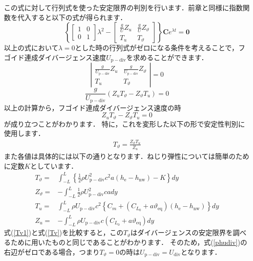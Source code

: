\documentclass{jarticle}
\begin{document}
この式に対して行列式を使った安定限界の判別を行います．前章と同様に指数関数を代入すると以下の式が得られます．
\begin{equation}
    \left\{
    \begin{bmatrix}
        1 & 0 \\
        0 & 1
    \end{bmatrix}
    \lambda^2
    -
    \begin{bmatrix}
        \frac{g}{U}Z_u & \frac{g}{U}Z_\vartheta \\
        T_u & T_\vartheta
    \end{bmatrix}
    \right\}
    \bm{C}e^{\lambda t}
    =
    \bm{0}
\end{equation}
以上の式において$\lambda=0$とした時の行列式がゼロになる条件を考えることで，フゴイド連成ダイバージェンス速度$U_\mathrm{p-div}$を求めることができます．
\begin{equation}
    \left|
    \begin{matrix}
        \frac{g}{U_\mathrm{p-div}}Z_u & \frac{g}{U_\mathrm{p-div}}Z_\vartheta \\
        T_u & T_\vartheta
    \end{matrix}
    \right|
    =0
\end{equation}
\begin{equation}
    \frac{g}{U_\mathrm{p-div}} (Z_u T_\vartheta - Z_\vartheta T_u ) = 0
\end{equation}
以上の計算から，フゴイド連成ダイバージェンス速度の時
\begin{equation}
    Z_u T_\vartheta - Z_\vartheta T_u  = 0
\end{equation}
が成り立つことがわかります．
特に，これを変形した以下の形で安定性判別に使用します．
\begin{align}\label{phudiv}
    T_\vartheta = \frac{Z_\vartheta T_u}{Z_u}
\end{align}
また各値は具体的には以下の通りとなります．ねじり弾性については簡単のために定数$K$としています．
\begin{align}
    T_\vartheta =& \int_{-L}^{L} \left\{ \frac{1}{2}\rho U_\mathrm{p-div}^2 c^2 a  (h_\mathrm{e}-h_\mathrm{nw}) - K \right\} dy \label{Tv1} \\
    Z_\vartheta =& -\int_{-L}^L \frac{1}{2}\rho U_\mathrm{p-div}^2 c a dy \\
    T_u =& \int_{-L}^L \rho U_\mathrm{p-div} c^2 \left\{ C_m +  (C_{L_0} + a\vartheta_\mathrm{eq})  (h_\mathrm{e}-h_\mathrm{nw}) \right\} dy \\
    Z_u =& -\int_{-L}^L \rho U_\mathrm{p-div} c (C_{L_0} + a\vartheta_\mathrm{eq}) dy
\end{align}
式(\ref{Tv1})と式(\ref{Tv})を比較すると，この$T_\vartheta$はダイバージェンスの安定限界を調べるために用いたものと同じであることがわかります．
そのため，式(\ref{phudiv})の右辺がゼロである場合，つまり$T_\vartheta=0$の時は$U_\mathrm{p-div}=U_\mathrm{div}$となります．
\end{document}

